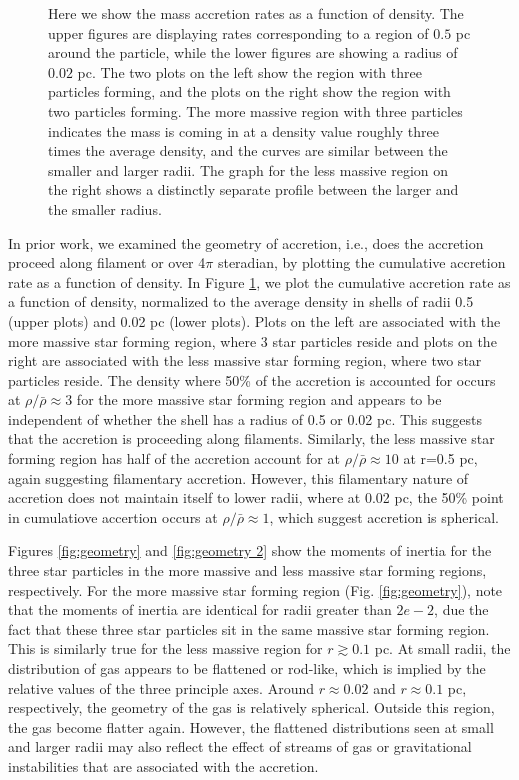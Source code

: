 \documentclass{emulateapj}
\begin{document}
\begin{figure}
\caption{Here we show the mass accretion rates as a function of density.  The upper figures are displaying rates corresponding to a region of $0.5$ pc around the particle, while the lower figures are showing a radius of $0.02$ pc.  The two plots on the left show the region with three particles forming, and the plots on the right show the region with two particles forming.  The more massive region with three particles indicates the mass is coming in at a density value roughly three times the average density, and the curves are similar between the smaller and larger radii.  The graph for the less massive region on the right shows a distinctly separate profile between the larger and the smaller radius.   \label{fig:accretion average rho}}
\end{figure}

In prior work, we examined the geometry of accretion, i.e., does the accretion proceed along filament or over 4$\pi$ steradian, by plotting the cumulative accretion rate as a function of density. In Figure \ref{fig:accretion average rho}, we plot the cumulative accretion rate as a function of density, normalized to the average density in shells of radii 0.5 (upper plots) and 0.02 pc (lower plots).  Plots on the left are associated with the more massive star forming region, where 3 star particles reside and plots on the right are associated with the less massive star forming region, where two star particles reside.  The density where 50\% of the accretion is accounted for occurs at $\rho/\bar{\rho} \approx 3$ for the more massive star forming region and appears to be independent of whether the shell has a radius of 0.5 or 0.02 pc.  This suggests that the accretion is proceeding along filaments.  Similarly, the less massive star forming region has half of the accretion account for at $\rho/\bar{\rho} \approx 10$ at r=0.5 pc, again suggesting filamentary accretion.  However, this filamentary nature of accretion does not maintain itself to lower radii, where at 0.02 pc, the 50\% point in cumulatiove accertion occurs at $\rho/\bar{\rho} \approx 1$, which suggest accretion is spherical.

Figures \ref{fig:geometry} and \ref{fig:geometry 2} show the moments of inertia for the three star particles in the more massive and less massive star forming regions, respectively.  For the more massive star forming region (Fig. \ref{fig:geometry}), note that the moments of inertia are identical for radii greater than $2e-2$, due the fact that these three star particles sit in the same massive star forming region. This is similarly true for the less massive region for $r\gtrsim 0.1$ pc.  At small radii, the distribution of gas appears to be flattened or rod-like, which is implied by the relative values of the three principle axes.  Around $r\approx 0.02$ and $r \approx 0.1$ pc, respectively, the geometry of the gas is relatively spherical.  Outside this region, the gas become flatter again. However, the flattened distributions seen at small and larger radii may also reflect the effect of streams of gas or gravitational instabilities that are associated with the accretion. 
\end{document}
